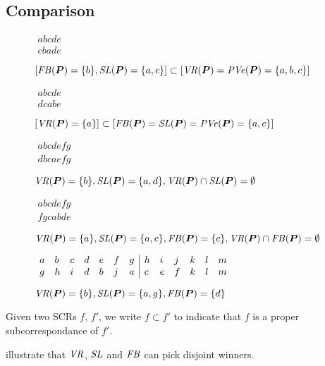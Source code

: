 \documentclass[version=3.21, pagesize, twoside=off, bibliography=totoc, DIV=calc, fontsize=12pt, a4paper]{scrartcl}
\begin{document}
\subsection{Comparison}
\begin{figure}
	\caption{$[\mathit{FB}(\bm{P}) = \{b\}, \mathit{SL}(\bm{P}) = \{a, c\}] \subset [\mathit{VR}(\bm{P}) = \mathit{PVe}(\bm{P}) = \{a, b, c\}]$}
	\label{fig:cbade}
	$\begin{array}{l}
		abcde\\
		cbade
	\end{array}$
\end{figure}
\begin{figure}
	\caption{$[\mathit{VR}(\bm{P}) = \{a\}] \subset [\mathit{FB}(\bm{P}) = \mathit{SL}(\bm{P}) = \mathit{PVe}(\bm{P}) = \{a, c\}]$}
	\label{fig:dcabe}
	$\begin{array}{l}
		abcde\\
		dcabe
	\end{array}$
\end{figure}
\begin{figure}
	\caption{$\mathit{VR}(\bm{P}) = \{b\}, \mathit{SL}(\bm{P}) = \{a, d\}, \mathit{VR}(\bm{P}) \cap \mathit{SL}(\bm{P}) = \emptyset$}
	\label{fig:dbcaefg}
	$\begin{array}{l}
		abcdefg\\
		dbcaefg
	\end{array}$
\end{figure}
\begin{figure}
	\caption{$\mathit{VR}(\bm{P}) = \{a\}, \mathit{SL}(\bm{P}) = \{a, c\}, \mathit{FB}(\bm{P}) = \{c\}, \mathit{VR}(\bm{P}) \cap \mathit{FB}(\bm{P}) = \emptyset$}
	\label{fig:fgcabde}
	$\begin{array}{l}
		abcdefg\\
		fgcabde
	\end{array}$
\end{figure}
\begin{figure}
	\caption{$\mathit{VR}(\bm{P}) = \{b\}, \mathit{SL}(\bm{P}) = \{a, g\}, \mathit{FB}(\bm{P}) = \{d\}$}
	\label{fig:disjoint}
	$\begin{array}{llll lll | llll ll}
		a&b&c&d&e&f&g&h&i&j&k&l&m\\
		g&h&i&d&b&j&a&c&e&f&k&l&m\\
	\end{array}$
\end{figure}

Given two SCRs $f$, $f'$, we write $f \subset f'$ to indicate that $f$ is a proper subcorrespondance of $f'$.

 illustrate that $\mathit{VR}$, $\mathit{SL}$ and $\mathit{FB}$ can pick disjoint winners.
\end{document}
